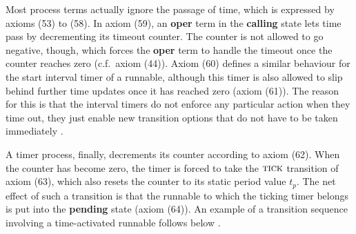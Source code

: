 \documentclass[10pt,conference]{IEEEtran}
\begin{document}
Most process terms actually ignore the passage of time, which is expressed by axioms (53) to (58). In axiom (59), an \textbf{oper} term in the \textbf{calling} state lets time pass by decrementing its timeout counter. The counter is not allowed to go negative, though, which forces the \textbf{oper} term to handle the timeout once the counter reaches zero (c.f.\ axiom (44)). Axiom (60) defines a similar behaviour for the start interval timer of a runnable, although this timer is also allowed to slip behind further time updates once it has reached zero (axiom (61)). The reason for this is that the interval timers do not enforce any particular action when they time out, they just enable new transition options that do not have to be taken immediately \cite[ch.~4.2.3]{AR:RTE}.

A timer process, finally, decrements its counter according to axiom (62). When the counter has become zero, the timer is forced to take the $\textsc{tick}$ transition of axiom (63), which also resets the counter to its static period value $t_p$. The net effect of such a transition is that the runnable to which the ticking timer belongs is put into the \textbf{pending} state (axiom (64)). An example of a transition sequence involving a time-activated runnable follows below \cite[ch.~4.2.2.8]{AR:RTE}.
\end{document}
